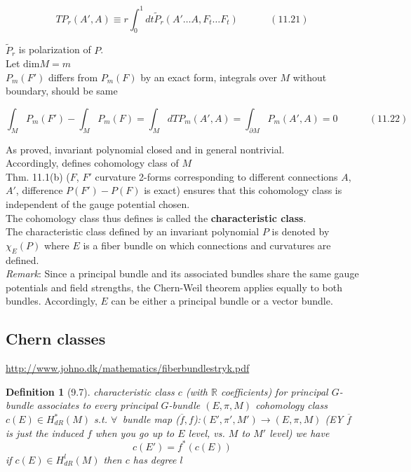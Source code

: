 \documentclass[twoside]{amsart}
\newtheorem{definition}{Definition}
\begin{document}
\begin{equation}
TP_r(A',A) \equiv r \int_0^1 dt \widetilde{P}_r{ (A' \dots A, F_t \dots F_t ) }  \quad \quad \quad \, (11.21)
\end{equation}

$\widetilde{P}_r$ is polarization of $P$. \\

Let $\text{dim}{M} = m$ \\
$P_m(F')$ differs from $P_m(F)$ by an exact form, integrals over $M$ without boundary, should be same

\begin{equation}
  \int_M P_m(F') - \int_M P_m(F) = \int_M dTP_m(A',A) = \int_{\partial M} P_m(A',A) = 0 \quad \quad \quad \, (11.22)
\end{equation}


As proved, invariant polynomial closed and in general nontrivial.  \\
Accordingly, defines cohomology class of $M$ \\

Thm. 11.1(b) ($F$, $F'$ curvature 2-forms corresponding to different connections $A$, $A'$, difference $P(F')- P(F)$ is exact) ensures that this cohomology class is independent of the gauge potential chosen. \\
The cohomology class thus defines is called the \textbf{characteristic class}. \\
The characteristic class defined by an invariant polynomial $P$ is denoted by $\chi_E(P)$ where $E$ is a fiber bundle on which connections and curvatures are defined.   \\

\emph{Remark}: Since a principal bundle and its associated bundles share the same gauge potentials and field strengths, the Chern-Weil theorem applies equally to both bundles.  Accordingly, $E$ can be either a principal bundle or a vector bundle.

\subsection{Chern classes}

\url{http://www.johno.dk/mathematics/fiberbundlestryk.pdf}

\begin{definition}[9.7]
\emph{characteristic class} $c$ (with $\mathbb{R}$ coefficients) for principal $G$-bundle associates to every principal $G$-bundle $(E,\pi,M)$ cohomology class $c(E) \in H^*_{dR}(M)$ s.t. $\forall \, $ bundle map ($\overline{f}, f$):$(E',\pi', M') \to (E,\pi,M)$ (EY $\overline{f}$ is just the induced $f$ when you go up to $E$ level, vs. $M$ to $M'$ level) we have
\[
c(E') = f^*(c(E))
\]
if $c(E) \in H^l_{dR}(M)$ then $c$ has degree $l$
\end{definition}
\end{document}
